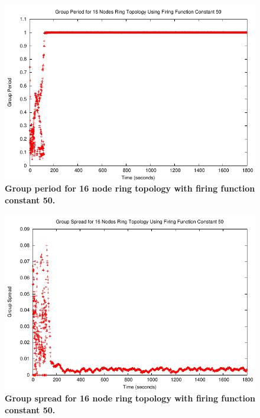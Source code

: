 \begin{figure}[t]
\begin{center}
\includegraphics[width=1.0\hsize]{./figures/5-Jan-2005-1-RING-NODES-16-50CONSTANT-GROUP-PERIOD.pdf}
\end{center}
\caption{{\small {\bf Group period for 16 node ring topology with firing function constant 50.}}} 
\label{fig:rgp}
\end{figure}

\begin{figure}[t]
\begin{center}
\includegraphics[width=1.0\hsize]{./figures/5-Jan-2005-1-RING-NODES-16-50CONSTANT-GROUP-SPREAD.pdf}
\end{center}
\caption{{\small {\bf Group spread for 16 node ring topology with firing function constant 50.}}}
\label{fig:rgs}
\end{figure}


